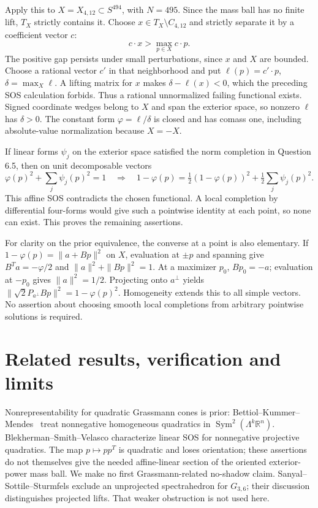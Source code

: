 \documentclass[11pt]{article}
\begin{document}
Apply this to $X=X_{4,12}\subset S^{494}$, with $N=495$. Since the mass
ball has no finite lift, $T_X$ strictly contains it. Choose
$x\in T_X\setminus C_{4,12}$ and strictly separate it by a coefficient
vector $c$:
\[
 c\cdot x>\max_{p\in X}c\cdot p.
\]
The positive gap persists under small perturbations, since $x$ and $X$
are bounded. Choose a rational vector $c'$ in that neighborhood and
put $\ell(p)=c'\cdot p$, $\delta=\max_X\ell$. A lifting matrix for $x$
makes $\delta-\ell(x)<0$, which the preceding SOS calculation forbids.
Thus a rational unnormalized failing functional exists. Signed coordinate
wedges belong to $X$ and span the exterior space, so nonzero $\ell$ has
$\delta>0$. The constant form $\varphi=\ell/\delta$ is closed and has
comass one, including absolute-value normalization because $X=-X$.

If linear forms $\psi_j$ on the exterior space satisfied the norm
completion in Question 6.5, then on unit decomposable vectors
\[
 \varphi(p)^2+\sum_j\psi_j(p)^2=1
 \quad\Longrightarrow\quad
 1-\varphi(p)=\tfrac12(1-\varphi(p))^2+
                         \tfrac12\sum_j\psi_j(p)^2.
\]
This affine SOS contradicts the chosen functional. A local completion by
differential four-forms would give such a pointwise identity at each point,
so none can exist. This proves the remaining assertions.

For clarity on the prior equivalence, the converse at a point is also
elementary. If $1-\varphi(p)=\|a+Bp\|^2$ on $X$, evaluation at $\pm p$
and spanning give $B^Ta=-\varphi/2$ and
$\|a\|^2+\|Bp\|^2=1$. At a maximizer $p_0$, $Bp_0=-a$; evaluation at
$-p_0$ gives $\|a\|^2=1/2$. Projecting onto $a^\perp$ yields
$\|\sqrt2 P_{a^\perp}Bp\|^2=1-\varphi(p)^2$. Homogeneity extends this
to all simple vectors. No assertion about choosing smooth local completions
from arbitrary pointwise solutions is required.

\section{Related results, verification and limits}
Nonrepresentability for quadratic Grassmann cones is prior:
Bettiol--Kummer--Mendes~\cite[Corollary 4.2 and Remark 4.3]{curvature} treat
nonnegative homogeneous quadratics in
$\operatorname{Sym}^2(\Lambda^k\mathbb R^n)$. Blekherman--Smith--Velasco
\cite[Theorem 1.1]{bsv} characterize linear SOS for nonnegative projective
quadratics. The map $p\mapsto pp^T$ is quadratic and loses orientation;
these assertions do not themselves give the needed affine-linear section
of the oriented exterior-power mass ball. We make no first
Grassmann-related no-shadow claim. Sanyal--Sottile--Sturmfels
\cite[Theorem 7.6]{orbitopes} exclude an unprojected spectrahedron for
$G_{3,6}$; their discussion distinguishes projected lifts. That weaker
obstruction is not used here.
\end{document}
